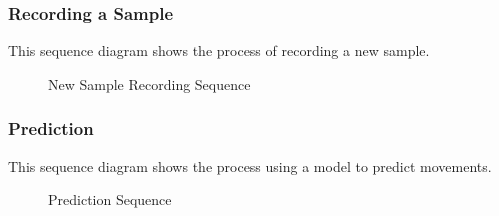 \subsubsection{Recording a Sample}
This sequence diagram shows the process of recording a new sample.
\begin{figure}[!htb]
    \centering
    \caption{New Sample Recording Sequence}
    \label{fig:seq-mob-new}
\end{figure}

\subsubsection{Prediction}
This sequence diagram shows the process using a model to predict movements.
\begin{figure}[!htb]
    \centering
    \caption{Prediction Sequence}
    \label{fig:seq-mob-pre}
\end{figure}

